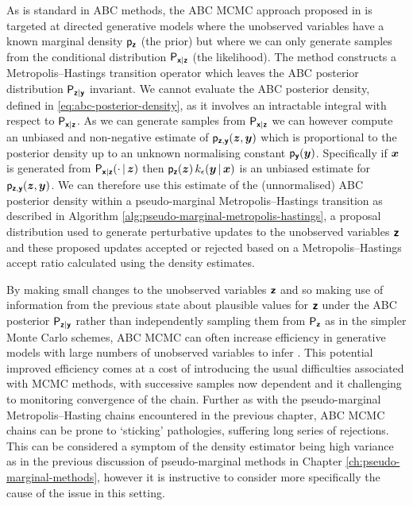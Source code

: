 As is standard in \ac{ABC} methods, the \ac{ABC} \ac{MCMC} approach proposed in \citep{marjoram2003markov} is targeted at directed generative models where the unobserved variables have a known marginal density $\mathsf{p}_{\boldsymbol{\mathsf{z}}}$ (the prior) but where we can only generate samples from the conditional distribution $\mathsf{P}_{\boldsymbol{\mathsf{x}}|\boldsymbol{\mathsf{z}}}$ (the likelihood). The method constructs a Metropolis--Hastings transition operator which leaves the \ac{ABC} posterior distribution $\mathsf{P}_{\boldsymbol{\mathsf{z}}|\boldsymbol{\mathsf{y}}}$ invariant. We cannot evaluate the \ac{ABC} posterior density, defined in \eqref{eq:abc-posterior-density}, as it involves an intractable integral with respect to $\mathsf{P}_{\boldsymbol{\mathsf{x}}|\boldsymbol{\mathsf{z}}}$. As we can generate samples from $\mathsf{P}_{\boldsymbol{\mathsf{x}}|\boldsymbol{\mathsf{z}}}$ we can however compute an unbiased and non-negative estimate of $\mathsf{p}_{\boldsymbol{\mathsf{z}},\boldsymbol{\mathsf{y}}}(\boldsymbol{z},\boldsymbol{y})$ which is proportional to the posterior density up to an unknown normalising constant $\mathsf{p}_{\boldsymbol{\mathsf{y}}}(\boldsymbol{y})$. Specifically if $\boldsymbol{x}$ is generated from $\mathsf{P}_{\boldsymbol{\mathsf{x}}|\boldsymbol{\mathsf{z}}}(\cdot \operatorname{|} \boldsymbol{z})$ then $\mathsf{p}_{\boldsymbol{\mathsf{z}}}(\boldsymbol{z})\,k_\epsilon(\boldsymbol{y}\operatorname{|}\boldsymbol{x})$ is an unbiased estimate for $\mathsf{p}_{\boldsymbol{\mathsf{z}},\boldsymbol{\mathsf{y}}}(\boldsymbol{z},\boldsymbol{y})$. We can therefore use this estimate of the (unnormalised) \ac{ABC} posterior density within a pseudo-marginal Metropolis--Hastings transition as described in Algorithm \ref{alg:pseudo-marginal-metropolis-hastings}, a proposal distribution used to generate perturbative updates to the unobserved variables $\boldsymbol{\mathsf{z}}$ and these proposed updates accepted or rejected based on a Metropolis--Hastings accept ratio calculated using the density estimates.

By making small changes to the unobserved variables $\boldsymbol{\mathsf{z}}$ and so making use of information from the previous state about plausible values for $\boldsymbol{\mathsf{z}}$ under the \ac{ABC} posterior $\mathsf{P}_{\boldsymbol{\mathsf{z}}|\boldsymbol{\mathsf{y}}}$  rather than independently sampling them from $\mathsf{P}_{\boldsymbol{\mathsf{z}}}$ as in the simpler Monte Carlo schemes, \ac{ABC} \ac{MCMC} can often increase efficiency in generative models with large numbers of unobserved variables to infer \cite{sisson2011likelihood}. This potential improved efficiency comes at a cost of introducing the usual difficulties associated with \ac{MCMC} methods, with successive samples now dependent and it challenging to monitoring convergence of the chain. Further as with the pseudo-marginal Metropolis--Hasting chains encountered in the previous chapter, \ac{ABC} \ac{MCMC} chains can be prone to `sticking' pathologies, suffering long series of rejections. This can be considered a symptom of the density estimator being high variance as in the previous discussion of pseudo-marginal methods in Chapter \ref{ch:pseudo-marginal-methods}, however it is instructive to consider more specifically the cause of the issue in this setting. 

